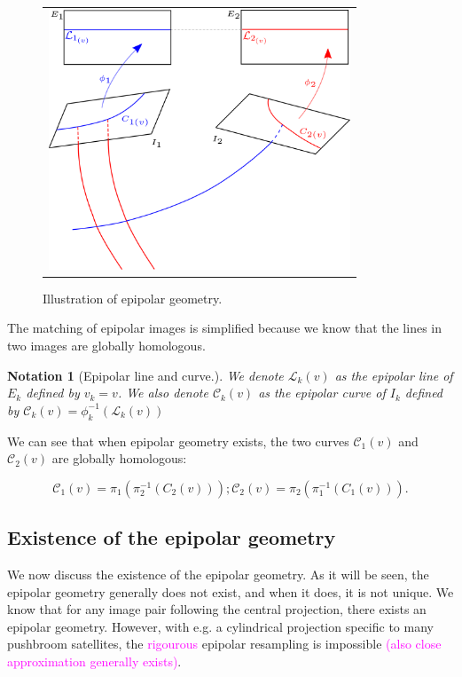 \documentclass{ipol}
\newcommand{\PiOT}[1]{\pi_1(\pi_2^{-1}(#1))}
\newcommand{\PiTO}[1]{\pi_2(\pi_1^{-1}(#1))}
\newcommand{\LineE}[1]{\ensuremath{\mathcal{L}_{#1}}}
\newcommand{\LineK}{\LineE{k}}
\newcommand{\CurveE}[1]{\ensuremath{\mathcal{C}_{#1}}}
\newcommand{\CurveO}{\CurveE{1}}
\newcommand{\CurveT}{\CurveE{2}}
\newcommand{\CurveK}{\CurveE{k}}
\newtheorem{notation}{Notation}
\newcommand{\er}[1]{\textcolor{orange}{#1}}
\newcommand{\mpd}[1]{\textcolor{magenta}{#1}}
\begin{document}
\begin{figure}
\centering
\begin{tabular}{c}
\includegraphics[width=9cm]{FIGS/Epip.png} 
\end{tabular}
\caption{Illustration of epipolar geometry.}
\label{FigDefEpip}
\end{figure}


\noindent The matching of epipolar images is simplified because we know that the lines in two images are globally homologous. 


\begin{notation}[Epipolar line and curve.]
We denote $\LineK(v)$  as the epipolar  line of $E_k$ defined by $v_k=v$. We also denote $\CurveK(v)$ as the epipolar
curve of $I_k$ defined by $\CurveK(v) = \phi_k^{-1}(\LineK(v))$
\end{notation}
%
\noindent We can see that when epipolar geometry exists, the two curves $\CurveO(v)$ and $\CurveT(v)$ are globally homologous:

\begin{equation}
     \CurveO(v) = \PiOT{C_2(v)}   ;  \CurveT(v) = \PiTO{C_1(v)}.\label{Eq:CurvHom}
\end{equation}



\subsection{Existence of the epipolar geometry}\label{ExistEpip} 

We now discuss the existence of the {epipolar geometry}. As it will be seen, the epipolar geometry generally does not exist, and when it does, it is not
unique. We know that for any image pair following the {central projection}, there exists an epipolar geometry. However, with e.g. a cylindrical projection specific to many pushbroom satellites, the \mpd{rigourous} epipolar resampling is impossible \mpd{(also close approximation generally exists)}.
\end{document}

